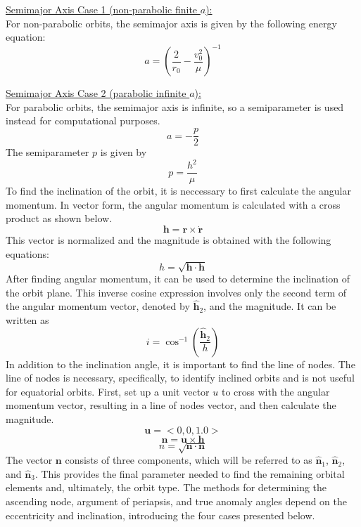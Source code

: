 \underline{Semimajor Axis Case 1 (non-parabolic finite $a$):}\\
For non-parabolic orbits, the semimajor axis is given by the following energy equation:
\begin{equation}
a = (\frac{2}{r_0}-\frac{v_0^2}{\mu})^{-1}
\end{equation}

\underline{Semimajor Axis Case 2 (parabolic infinite $a$):}\\
For parabolic orbits, the semimajor axis is infinite, so a semiparameter is used instead for computational purposes.
\begin{equation}
a = - \frac{p}{2}
\end{equation}
The semiparameter $p$ is given by
\begin{equation}
p = \frac{h^2}{\mu}
\end{equation}
To find the inclination of the orbit, it is neccessary to first calculate the angular momentum. In vector form, the angular momentum is calculated with a cross product as shown below.
\begin{equation}
\bm{h} = \bm{r} \times \bm{\dot{r}}
\end{equation}
This vector is normalized and the magnitude is obtained with the following equations:
\begin{equation}
h = \sqrt{\bm{h} \cdot \bm{h}}
\end{equation}
After finding angular momentum, it can be used to determine the inclination of the orbit plane. This inverse cosine expression involves only the second term of the angular momentum vector, denoted by $\bm{\hat{h}}_2$, and the magnitude. It can be written as
\begin{equation}
i = \cos^{-1}(\frac{\bm{\hat{h}}_2}{h})
\end{equation}
In addition to the inclination angle, it is important to find the line of nodes. The line of nodes is necessary, specifically, to identify inclined orbits and is not useful for equatorial orbits. First, set up a unit vector $u$ to cross with the angular momentum vector, resulting in a line of nodes vector, and then calculate the magnitude.
\begin{equation}
\bm{u} = <0, 0, 1.0>
\end{equation}
\begin{equation}
\bm{n} = \bm{u} \times \bm{h}
\end{equation}
\begin{equation}
n = \sqrt{\bm{n} \cdot \bm{n}}
\end{equation}
The vector $\bm{n}$ consists of three components, which will be referred to as $\bm{\hat{n}}_1$, $\bm{\hat{n}}_2$, and $\bm{\hat{n}}_3$. This provides the final parameter needed to find the remaining orbital elements and, ultimately, the orbit type. The methods for determining the ascending node, argument of periapsis, and true anomaly angles depend on the eccentricity and inclination, introducing the four cases presented below.
